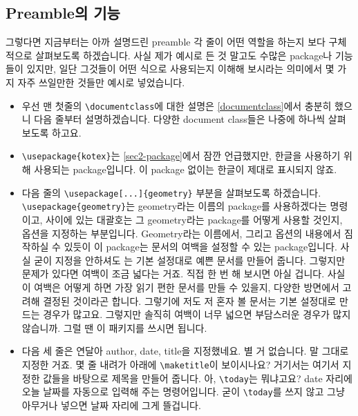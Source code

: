 \subsection{Preamble의 기능}
\label{sec:text-preamble}
그렇다면 지금부터는 아까 설명드린 preamble 각 줄이 어떤 역할을 하는지 보다 구체적으로 살펴보도록 하겠습니다.
사실 제가 예시로 든 것 말고도 수많은 package나 기능들이 있지만, 일단 그것들이 어떤 식으로 사용되는지 이해해 보시라는 의미에서 몇 가지 자주 쓰일만한 것들만 예시로 넣었습니다.
\begin{itemize}
  \item 우선 맨 첫줄의 \verb|\documentclass|에 대한 설명은 \ref{documentclass}에서 충분히 했으니 다음 줄부터 설명하겠습니다. 다양한 document class들은 나중에 하나씩 살펴보도록 하고요.

  \item \verb|\usepackage{kotex}|는 \ref{sec2-package}에서 잠깐 언급했지만, 한글을 사용하기 위해 사용되는 package입니다. 이 package 없이는 한글이 제대로 표시되지 않죠.

  \item 다음 줄의 \verb|\usepackage[...]{geometry}| 부분을 살펴보도록 하겠습니다. \verb|\usepackage{geometry}|는 geometry라는 이름의 package를 사용하겠다는 명령이고, 사이에 있는 대괄호는 그 geometry라는 package를 어떻게 사용할 것인지, 옵션을 지정하는 부분입니다. Geometry라는 이름에서, 그리고 옵션의 내용에서 짐작하실 수 있듯이 이 package는 문서의 여백을 설정할 수 있는 package입니다. 사실 굳이 지정을 안하셔도 \lt 는 기본 설정대로 예쁜 문서를 만들어 줍니다. 그렇지만 문제가 있다면 여백이 조금 넓다는 거죠. 직접 한 번 해 보시면 아실 겁니다. 사실 이 여백은 어떻게 하면 가장 읽기 편한 문서를 만들 수 있을지, 다양한 방면에서 고려해 결정된 것이라곤 합니다. 그렇기에 저도 저 혼자 볼 문서는 기본 설정대로 만드는 경우가 많고요. 그렇지만 솔직히 여백이 너무 넓으면 부담스러운 경우가 많지 않습니까. 그럴 땐 이 패키지를 쓰시면 됩니다.
    
  \item 다음 세 줄은 연달아 author, date, title을 지정했네요. 별 거 없습니다. 말 그대로 지정한 거죠. 몇 줄 내려가 \verb||아래에 \verb|\maketitle|이 보이시나요? 거기서는 여기서 지정한 값들을 바탕으로 제목을 만들어 줍니다. 아, \verb|\today|는 뭐냐고요? date 자리에 오늘 날짜를 자동으로 입력해 주는 명령어입니다. 굳이 \verb|\today|를 쓰지 않고 그냥 아무거나 넣으면 날짜 자리에 그게 뜰겁니다. 
\end{itemize}

